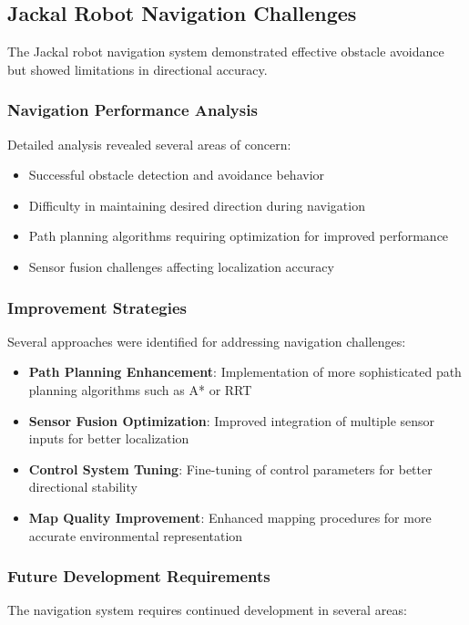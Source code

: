 \documentclass{book}
\begin{document}
\subsection{Jackal Robot Navigation Challenges}

\par\noindent The Jackal robot navigation system demonstrated effective obstacle avoidance but showed limitations in directional accuracy.

\subsubsection{Navigation Performance Analysis}
\par\noindent Detailed analysis revealed several areas of concern:

\begin{itemize}
\item Successful obstacle detection and avoidance behavior
\item Difficulty in maintaining desired direction during navigation
\item Path planning algorithms requiring optimization for improved performance
\item Sensor fusion challenges affecting localization accuracy
\end{itemize}

\subsubsection{Improvement Strategies}
\par\noindent Several approaches were identified for addressing navigation challenges:

\begin{itemize}
\item \textbf{Path Planning Enhancement}: Implementation of more sophisticated path planning algorithms such as A* or RRT
\item \textbf{Sensor Fusion Optimization}: Improved integration of multiple sensor inputs for better localization
\item \textbf{Control System Tuning}: Fine-tuning of control parameters for better directional stability
\item \textbf{Map Quality Improvement}: Enhanced mapping procedures for more accurate environmental representation
\end{itemize}

\subsubsection{Future Development Requirements}
\par\noindent The navigation system requires continued development in several areas:
\end{document}
